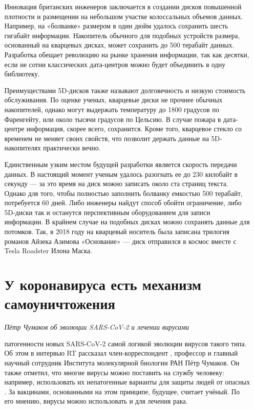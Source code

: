 Инновация британских инженеров заключается в создании дисков повышенной плотности и размещении на небольшом участке колоссальных объемов данных. Например, на «болванке» размером в один дюйм удалось сохранить шесть гигабайт информации. Накопитель обычного для подобных устройств размера, основанный на кварцевых дисках, может сохранить до 500 терабайт данных. Разработка обещает революцию на рынке хранения информации, так как десятки, если не сотни классических дата-центров можно будет объединить в одну библиотеку.

Преимуществами 5D-дисков также называют долговечность и низкую стоимость обслуживания. По оценке ученых, кварцевые диски не прочнее обычных накопителей, однако могут выдержать температуру до 1800 градусов по Фаренгейту, или около тысячи градусов по Цельсию. В случае пожара в дата-центре информация, скорее всего, сохранится. Кроме того, кварцевое стекло со временем не меняет своих свойств, что позволит держать данные на 5D-накопителях практически вечно.

Единственным узким местом будущей разработки является скорость передачи данных. В настоящий момент ученым удалось разогнать ее до 230 килобайт в секунду --- за это время на диск можно записать около ста страниц текста. Однако для того, чтобы полностью заполнить болванку емкостью 500 терабайт, потребуется 60 дней. Либо инженеры найдут способ обойти ограничение, либо 5D-диски так и останутся перспективным оборудованием для записи информации. В крайнем случае на подобных дисках можно сохранять данные для потомков. Так, в 2018 году на кварцевый носитель была записана трилогия романов Айзека Азимова «Основание» --- диск отправился в космос вместе с Tesla Roadster Илона Маска.


\clearpage
\section{У коронавируса есть механизм самоуничтожения}
\textit{Пётр Чумаков об эволюции SARS-CoV-2 и лечении вирусами}

 патогенности новых  SARS-CoV-2  самой логикой эволюции вирусов такого типа. Об этом в интервью RT рассказал член-корреспондент , профессор и главный научный сотрудник Института молекулярной биологии РАН Пётр Чумаков. Он также отметил, что многие вирусы можно поставить на службу человеку: например, использовать их непатогенные варианты для защиты людей от опасных . За вакцинами, основанными на этом принципе, будущее, считает учёный. По его мнению, вирусы можно использовать и для лечения рака.

